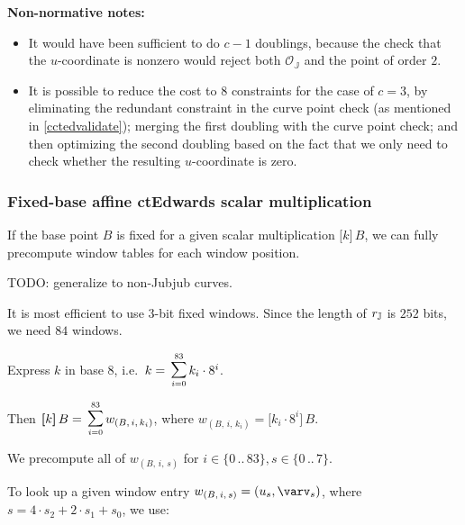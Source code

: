 \documentclass{article}
\newcommand{\crossref}[1]{\autoref{#1}}
\newcommand{\callout}[1]{\vspace{2ex plus 2pt minus 2pt}\noindent\textbf{#1}\hspace{1em}}
\newenvironment{nnotes}{\callout{Non-normative notes:}\begin{itemize}}{\end{itemize}}
\newcommand{\setof}[1]{\{{#1}\}}
\newcommand{\barerange}[2]{{{#1}\,..\,{#2}}}
\newcommand{\range}[2]{\setof{\barerange{#1}{#2}}}
\newcommand{\vop}[3]{\,\raisebox{0.29ex}{\scalebox{0.89}{$\smashoperator[r]{#3_{#1}^{#2}}$\,}}}
\newcommand{\vsum}[2]{\vop{#1}{#2}{\sum}}
\newcommand{\mult}{\cdot}
\newcommand{\scalarmult}[2]{\boldsymbol{[}{#1}\boldsymbol{]}\,{#2}}
\newcommand{\Zero}{\mathcal{O}}
\newcommand{\ParamJ}[1]{{{#1}_\mathbb{\hskip 0.01em J}}}
\newcommand{\GroupJ}{\mathbb{J}}
\newcommand{\ZeroJ}{\Zero_{\GroupJ}}
\begin{document}
\begin{nnotes}
  \item It would have been sufficient to do $c-1$ doublings, because
        the check that the $u$-coordinate is nonzero would reject both $\ZeroJ$
        and the point of order $2$.
  \item It is possible to reduce the cost to $8$ constraints for the case of $c = 3$,
        by eliminating the redundant constraint in the curve point check (as mentioned in
        \crossref{cctedvalidate}); merging the first doubling with the curve point check;
        and then optimizing the second doubling based on the fact that we only need
        to check whether the resulting $u$-coordinate is zero.
\end{nnotes}


\subsubsection{Fixed-base affine ctEdwards scalar multiplication} \label{cctfixedscalarmult}

If the base point $B$ is fixed for a given scalar multiplication $\scalarmult{k}{B}$,
we can fully precompute window tables for each window position.

TODO: generalize to non-Jubjub curves.

It is most efficient to use $3$-bit fixed windows. Since the length of
$\ParamJ{r}$ is $252$ bits, we need $84$ windows.

Express $k$ in base $8$, i.e.\ $k = \vsum{i=0}{83} k_i \mult 8^i$.

Then $\scalarmult{k}{B} = \vsum{i=0}{83} w_{(B,\,i,\,k_i)}$, where
$w_{(B,\,i,\,k_i)} = \scalarmult{k_i \mult 8^i}{B}$.

We precompute all of $w_{(B,\,i,\,s)}$ for $i \in \range{0}{83}, s \in \range{0}{7}$.

To look up a given window entry $w_{(B,\,i,\,s)} = (u_s, \varv_s)$, where
$s = 4 \mult s_2 + 2 \mult s_1 + s_0$, we use:
\end{document}
